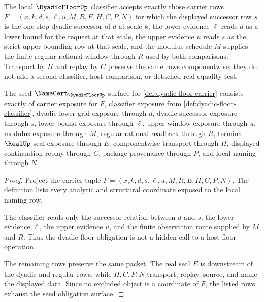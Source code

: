 \begin{definition}
\label{def:dyadic-floor-classifier}
The local $\DyadicFloorUp$ classifier accepts exactly those carrier rows $F=(x,k,d,s,\ell,u,M,R,E,H,C,P,N)$ for which the displayed successor row $s$ is the one-step dyadic successor of $d$ at scale $k$, the lower evidence $\ell$ reads $d$ as a lower bound for the request at that scale, the upper evidence $u$ reads $s$ as the strict upper bounding row at that scale, and the modulus schedule $M$ supplies the finite regular-rational window through $R$ used by both comparisons. Transport by $H$ and replay by $C$ preserve the same rows componentwise; they do not add a second classifier, host comparison, or detached real equality test.
\end{definition}

\begin{theorem}
\label{thm:dyadic-floor-namecert-obligations}
The seed $\NameCert_{\DyadicFloorUp}$ surface for \autoref{def:dyadic-floor-carrier} consists exactly of carrier exposure for $F$, classifier exposure from \autoref{def:dyadic-floor-classifier}, dyadic lower-grid exposure through $d$, dyadic successor exposure through $s$, lower-bound exposure through $\ell$, upper-window exposure through $u$, modulus exposure through $M$, regular rational readback through $R$, terminal $\RealUp$ seal exposure through $E$, componentwise transport through $H$, displayed continuation replay through $C$, package provenance through $P$, and local naming through $N$.
\end{theorem}
\begin{proof}
Project the carrier tuple $F=(x,k,d,s,\ell,u,M,R,E,H,C,P,N)$. The definition lists every analytic and structural coordinate exposed to the local naming row.

The classifier reads only the successor relation between $d$ and $s$, the lower evidence $\ell$, the upper evidence $u$, and the finite observation route supplied by $M$ and $R$. Thus the dyadic floor obligation is not a hidden call to a host floor operation.

The remaining rows preserve the same packet. The real seal $E$ is downstream of the dyadic and regular rows, while $H,C,P,N$ transport, replay, source, and name the displayed data. Since no excluded object is a coordinate of $F$, the listed rows exhaust the seed obligation surface.
\end{proof}

